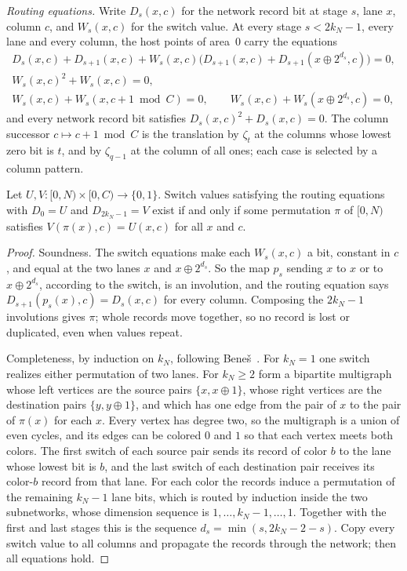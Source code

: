 \emph{Routing equations.} Write \(D_s(x,c)\) for the network record bit
at stage \(s\), lane \(x\), column \(c\), and \(W_s(x,c)\) for the switch
value. At every stage \(s<2k_N-1\), every lane and every column, the
host points of area~\(0\) carry the equations
\begin{gather*}
 D_s(x,c)+D_{s+1}(x,c)+W_s(x,c)\bigl(D_{s+1}(x,c)
 +D_{s+1}(x\oplus2^{d_s},c)\bigr)=0,\\
 W_s(x,c)^2+W_s(x,c)=0,\\
 W_s(x,c)+W_s(x,c+1\bmod C)=0,\qquad
 W_s(x,c)+W_s(x\oplus2^{d_s},c)=0,
\end{gather*}
and every network record bit satisfies \(D_s(x,c)^2+D_s(x,c)=0\). The
column successor \(c\mapsto c+1\bmod C\) is the translation by
\(\zeta_t\) at the columns whose lowest zero bit is \(t\), and by
\(\zeta_{q-1}\) at the column of all ones; each case is selected by a
column pattern.

\begin{lemma}[Routing]\label{earlier:r:lem:routing}
Let \(U,V:[0,N)\times[0,C)\to\{0,1\}\). Switch values satisfying the
routing equations with \(D_0=U\) and \(D_{2k_N-1}=V\) exist if and only
if some permutation \(\pi\) of \([0,N)\) satisfies
\(V(\pi(x),c)=U(x,c)\) for all \(x\) and \(c\).
\end{lemma}
\begin{proof}
Soundness. The switch equations make each \(W_s(x,c)\) a bit, constant
in \(c\), and equal at the two lanes \(x\) and \(x\oplus2^{d_s}\). So the
map \(p_s\) sending \(x\) to \(x\) or to \(x\oplus2^{d_s}\), according to
the switch, is an involution, and the routing equation says
\(D_{s+1}(p_s(x),c)=D_s(x,c)\) for every column. Composing the
\(2k_N-1\) involutions gives \(\pi\); whole records move together, so
no record is lost or duplicated, even when values repeat.

Completeness, by induction on \(k_N\), following
Beneš~\cite{Ben65}. For \(k_N=1\)
one switch realizes either permutation of two lanes. For \(k_N\ge2\)
form a bipartite multigraph whose left vertices are the source pairs
\(\{x,x\oplus1\}\), whose right vertices are the destination pairs
\(\{y,y\oplus1\}\), and which has one edge from the pair of \(x\) to the
pair of \(\pi(x)\) for each \(x\). Every vertex has degree two, so the
multigraph is a union of even cycles, and its edges can be colored
\(0\) and \(1\) so that each vertex meets both colors. The first switch
of each source pair sends its record of color \(b\) to the lane whose
lowest bit is \(b\), and the last switch of each destination pair
receives its color-\(b\) record from that lane. For each color the
records induce a permutation of the remaining \(k_N-1\) lane bits,
which is routed by induction inside the two subnetworks, whose
dimension sequence is \(1,\ldots,k_N-1,\ldots,1\). Together with the
first and last stages this is the sequence
\(d_s=\min(s,2k_N-2-s)\). Copy every switch value to all columns and
propagate the records through the network; then all equations hold.
\end{proof}

